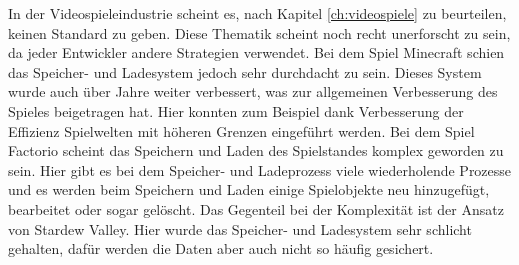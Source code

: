 In der Videospieleindustrie scheint es, nach Kapitel \ref{ch:videospiele} zu beurteilen, keinen Standard zu geben. Diese Thematik scheint noch recht unerforscht zu sein, da jeder Entwickler andere Strategien verwendet. Bei dem Spiel Minecraft schien das Speicher- und Ladesystem jedoch sehr durchdacht zu sein. Dieses System wurde auch über Jahre weiter verbessert, was zur allgemeinen Verbesserung des Spieles beigetragen hat. Hier konnten zum Beispiel dank Verbesserung der Effizienz Spielwelten mit höheren Grenzen eingeführt werden. Bei dem Spiel Factorio scheint das Speichern und Laden des Spielstandes komplex geworden zu sein. Hier gibt es bei dem Speicher- und Ladeprozess viele wiederholende Prozesse und es werden beim Speichern und Laden einige Spielobjekte neu hinzugefügt, bearbeitet oder sogar gelöscht. Das Gegenteil bei der Komplexität ist der Ansatz von Stardew Valley. Hier wurde das Speicher- und Ladesystem sehr schlicht gehalten, dafür werden die Daten aber auch nicht so häufig gesichert. 
